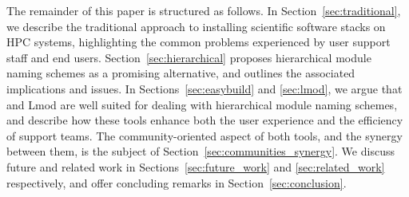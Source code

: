 The remainder of this paper is structured as follows. In Section~\ref{sec:traditional}, we describe the
traditional approach to installing scientific software stacks on HPC systems, highlighting the common problems experienced by user
support staff and end users. Section~\ref{sec:hierarchical} proposes hierarchical module naming schemes as a promising alternative, and
outlines the associated implications and issues. In Sections~\ref{sec:easybuild} and \ref{sec:lmod}, we argue that \easybuild{} and Lmod are well suited  for dealing with hierarchical
module naming schemes, and describe how these tools enhance both the user experience and
the efficiency of support teams. The community-oriented aspect of both tools, and the
synergy between them, is the subject of Section~\ref{sec:communities_synergy}. We discuss
future and related work in Sections~\ref{sec:future_work} and
\ref{sec:related_work} respectively, and offer concluding remarks in  Section~\ref{sec:conclusion}.

